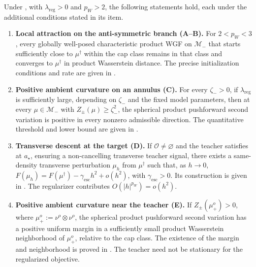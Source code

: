 \begin{proposition}
\label{prop:mf-local-geometry}
Under , with \(\lambda_{\mathrm{reg}}>0\) and \(p_W>2\), the following statements hold,
each under the additional conditions stated in its item.
\begin{enumerate}[label=(\roman*),ref=(\roman*),leftmargin=*]
\item \label{item:mf-local-attraction}
\textbf{Local attraction on the anti-symmetric branch (A--B).}
For \(2<p_W<3\), every globally well-posed characteristic product WGF on
\(\mathcal M_-\) that starts sufficiently close to \(\mu^\dagger\) within the
cap class remains in that class and converges to \(\mu^\dagger\) in product
Wasserstein distance.
The precise initialization conditions and rate are given in
.

\item \label{item:mf-annular-curvature}
\textbf{Positive ambient curvature on an annulus (C).}
For every \(\zeta_->0\), if \(\lambda_{\mathrm{reg}}\) is sufficiently large,
depending on \(\zeta_-\) and the fixed model parameters, then at every
\(\mu\in\mathcal M_-\) with \(Z_\pm(\mu)\ge\zeta_-^2\), the spherical product
pushforward second variation is positive in every nonzero admissible direction.
The quantitative threshold and lower bound are given in
.

\item \label{item:mf-transverse-descent}
\textbf{Transverse descent at the target (D).}
If \(\mathcal O\ne\varnothing\) and the teacher satisfies
at \(a_\star\), ensuring a non-cancelling transverse teacher signal,
there exists a same-density transverse perturbation \(\mu_h\) from
\(\mu^\dagger\) such that, as \(h\to0\),
\(F(\mu_h)=F(\mu^\dagger)-\gamma_{\mathrm{esc}}h^2+o(h^2)\),
with \(\gamma_{\mathrm{esc}}>0\).
Its construction is given in
.
The regularizer contributes \(O(|h|^{p_W})=o(h^2)\).

\item \label{item:mf-teacher-curvature}
\textbf{Positive ambient curvature near the teacher (E).}
If \(Z_\pm(\mu_+^o)>0\), where \(\mu_+^o:=\nu^o\otimes\nu^o\),
the spherical product pushforward second variation has a positive uniform
margin in a sufficiently
small product Wasserstein neighborhood of \(\mu_+^o\), relative to the cap class.
The existence of the margin and neighborhood is proved in
.
The teacher need not be stationary for the regularized objective.
\end{enumerate}
\end{proposition}
